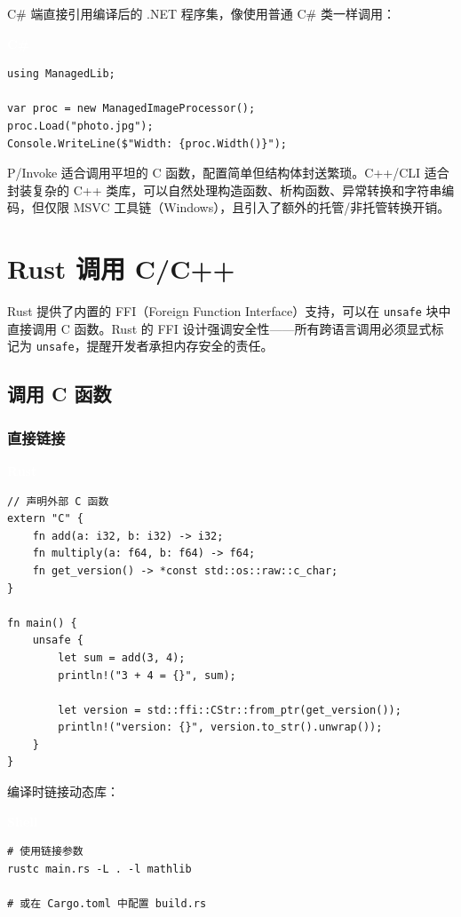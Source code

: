 \documentclass[12pt,a4paper,fontset=fandol]{ctexbook}
\newcommand{\csharplabel}{%
  \begin{tcolorbox}[enhanced,colback=csharpheadbg,colframe=csharpheadbg,
    arc=1mm,boxrule=0mm,left=6pt,right=6pt,top=2pt,bottom=2pt,
    halign=left,oversize]
    \textcolor{white}{\small\bfseries C\#}
  \end{tcolorbox}\vspace{-4pt}}
\newcommand{\rustlabel}{%
  \begin{tcolorbox}[enhanced,colback=rustheadbg,colframe=rustheadbg,
    arc=1mm,boxrule=0mm,left=6pt,right=6pt,top=2pt,bottom=2pt,
    halign=left,oversize]
    \textcolor{white}{\small\bfseries Rust}
  \end{tcolorbox}\vspace{-4pt}}
\newcommand{\bashlabel}{%
  \begin{tcolorbox}[enhanced,colback=black!80,colframe=black!80,
    arc=1mm,boxrule=0mm,left=6pt,right=6pt,top=2pt,bottom=2pt,
    halign=left,oversize]
    \textcolor{white}{\small\bfseries Shell}
  \end{tcolorbox}\vspace{-4pt}}
\newcommand{\cpp}[1]{C++#1}
\begin{document}
C\# 端直接引用编译后的 .NET 程序集，像使用普通 C\# 类一样调用：

\csharplabel
\begin{lstlisting}[style=csharpstyle]
using ManagedLib;

var proc = new ManagedImageProcessor();
proc.Load("photo.jpg");
Console.WriteLine($"Width: {proc.Width()}");
\end{lstlisting}

\begin{tcolorbox}[compare={P/Invoke 与 C++/CLI 对比}]
P/Invoke 适合调用平坦的 C 函数，配置简单但结构体封送繁琐。C++/CLI 适合封装复杂的 \cpp{} 类库，可以自然处理构造函数、析构函数、异常转换和字符串编码，但仅限 MSVC 工具链（Windows），且引入了额外的托管/非托管转换开销。
\end{tcolorbox}


\chapter{Rust 调用 C/C++}

Rust 提供了内置的 FFI（Foreign Function Interface）支持，可以在 \texttt{unsafe} 块中直接调用 C 函数。Rust 的 FFI 设计强调安全性——所有跨语言调用必须显式标记为 \texttt{unsafe}，提醒开发者承担内存安全的责任。

\section{调用 C 函数}

\subsection{直接链接}
\rustlabel
\begin{lstlisting}[style=ruststyle]
// 声明外部 C 函数
extern "C" {
    fn add(a: i32, b: i32) -> i32;
    fn multiply(a: f64, b: f64) -> f64;
    fn get_version() -> *const std::os::raw::c_char;
}

fn main() {
    unsafe {
        let sum = add(3, 4);
        println!("3 + 4 = {}", sum);

        let version = std::ffi::CStr::from_ptr(get_version());
        println!("version: {}", version.to_str().unwrap());
    }
}
\end{lstlisting}

编译时链接动态库：

\bashlabel
\begin{lstlisting}[style=bashstyle]
# 使用链接参数
rustc main.rs -L . -l mathlib

# 或在 Cargo.toml 中配置 build.rs
\end{lstlisting}
\end{document}
